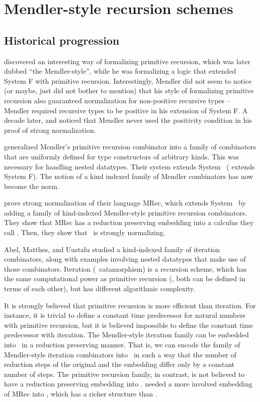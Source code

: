 \chapter{Mendler-style recursion schemes}\label{ch:mendler}

\section{Historical progression}
\citet{Mendler87} discovered an interesting way of formalizing
primitive recursion, which was later dubbed ``the Mendler-style'',
while he was formalizing a logic that extended System \textsf{F} with
primitive recursion. Interestingly, Mendler did not seem to notice
(or maybe, just did not bother to mention) that his style of formalizing
primitive recursion also guaranteed normalization for non-positive recursive
types -- Mendler required recursive types to be positive in his extension of
System \textsf{F}. A decade later, \citet{matthes98phd} and \citet{uustalu98phd}
noticed that Mendler never used the positivity condition in his proof of
strong normalization.

\citet{AbeMat04} generalized Mendler's primitive recursion combinator
\cite{Mendler87} into a family of combinators that are uniformly defined for
type constructors of arbitrary kinds. This was necessary for
handling nested datatypes. Their system extends System \Fw\ 
(\citet{Mendler87} extends System \textsf{F}). The notion
of a kind indexed family of Mendler combinators has now become the norm.

\citet{AbeMat04} prove strong normalization of their language \textsf{MRec},
which extends System \Fw\ by adding a family of kind-indexed Mendler-style
primitive recursion combinators. They show that \textsf{MRec} has
a reduction preserving embedding into a calculus they call \Fixw.
Then, they show that \Fixw\ is strongly normalizing.

Abel, Matthes, and Uustalu \cite{AbeMatUus03,AbeMatUus05} studied
a kind-indexed family of iteration combinators, along with examples
involving nested datatypes that make use of those combinators.
Iteration (\aka\ catamorphism) is a recursion scheme, which has the same
computational power as primitive recursion (\ie, both can be defined
in terms of each other), but has different algorithmic complexity. 

It is strongly believed that primitive recursion is more efficient than
iteration. For instance, it is trivial to define a constant time predecessor
for natural numbers with primitive recursion, but it is believed impossible
to define the constant time predecessor with iteration. The Mendler-style
iteration family can be embedded into \Fw\ in a reduction preserving manner.
That is, we can encode the family of Mendler-style iteration combinators
into \Fw\ in such a way that the number of reduction steps of the original
and the embedding differ only by a constant number of steps. The primitive
recursion family, in contrast, is not believed to have a reduction preserving
embedding into \Fw. \citet{AbeMat04} needed a more involved embedding of
\textsf{MRec} into \Fixw, which has a richer structure than \Fw.


